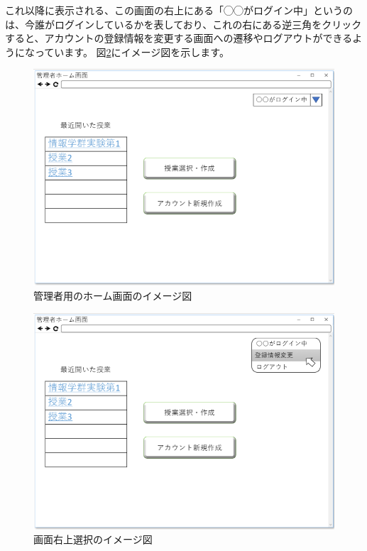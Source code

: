 これ以降に表示される、この画面の右上にある「◯◯がログイン中」というのは、今誰がログインしているかを表しており、これの右にある逆三角をクリックすると、アカウントの登録情報を変更する画面への遷移やログアウトができるようになっています。
図\ref{fig:05}にイメージ図を示します。

\begin{figure}[phtbp]
  \begin{center}
    \includegraphics[width=1\linewidth,clip]{./img/04.png}
    \caption{管理者用のホーム画面のイメージ図}\label{fig:04}
  \end{center}
\end{figure}

\begin{figure}[phtbp]
  \begin{center}
    \includegraphics[width=1\linewidth,clip]{./img/05.png}
    \caption{画面右上選択のイメージ図}\label{fig:05}
  \end{center}
\end{figure}

